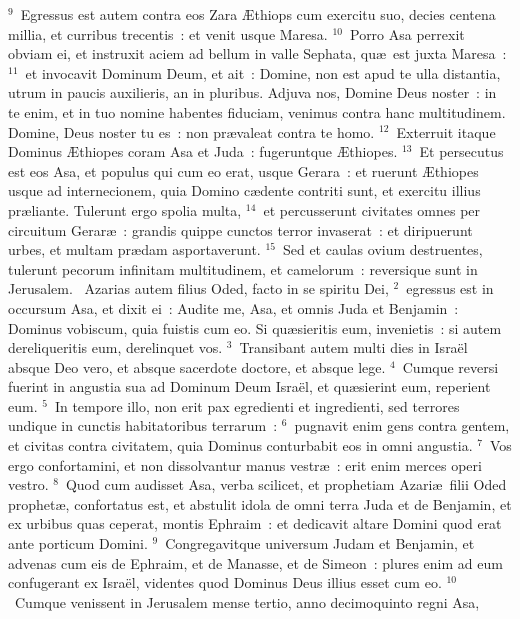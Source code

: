 ${}^{9}$~Egressus est autem contra eos Zara \AE thiops cum exercitu suo, decies centena millia, et curribus trecentis~: et venit usque Maresa.
${}^{10}$~Porro Asa perrexit obviam ei, et instruxit aciem ad bellum in valle Sephata, qu\ae\ est juxta Maresa~:
${}^{11}$~et invocavit Dominum Deum, et ait~: Domine, non est apud te ulla distantia, utrum in paucis auxilieris, an in pluribus. Adjuva nos, Domine Deus noster~: in te enim, et in tuo nomine habentes fiduciam, venimus contra hanc multitudinem. Domine, Deus noster tu es~: non pr\ae valeat contra te homo.
${}^{12}$~Exterruit itaque Dominus \AE thiopes coram Asa et Juda~: fugeruntque \AE thiopes.
${}^{13}$~Et persecutus est eos Asa, et populus qui cum eo erat, usque Gerara~: et ruerunt \AE thiopes usque ad internecionem, quia Domino c\ae dente contriti sunt, et exercitu illius pr\ae liante. Tulerunt ergo spolia multa,
${}^{14}$~et percusserunt civitates omnes per circuitum Gerar\ae~: grandis quippe cunctos terror invaserat~: et diripuerunt urbes, et multam pr\ae dam asportaverunt.
${}^{15}$~Sed et caulas ovium destruentes, tulerunt pecorum infinitam multitudinem, et camelorum~: reversique sunt in Jerusalem.
~Azarias autem filius Oded, facto in se spiritu Dei,
${}^{2}$~egressus est in occursum Asa, et dixit ei~: Audite me, Asa, et omnis Juda et Benjamin~: Dominus vobiscum, quia fuistis cum eo. Si qu\ae sieritis eum, invenietis~: si autem dereliqueritis eum, derelinquet vos.
${}^{3}$~Transibant autem multi dies in Isra\"el absque Deo vero, et absque sacerdote doctore, et absque lege.
${}^{4}$~Cumque reversi fuerint in angustia sua ad Dominum Deum Isra\"el, et qu\ae sierint eum, reperient eum.
${}^{5}$~In tempore illo, non erit pax egredienti et ingredienti, sed terrores undique in cunctis habitatoribus terrarum~:
${}^{6}$~pugnavit enim gens contra gentem, et civitas contra civitatem, quia Dominus conturbabit eos in omni angustia.
${}^{7}$~Vos ergo confortamini, et non dissolvantur manus vestr\ae~: erit enim merces operi vestro.
${}^{8}$~Quod cum audisset Asa, verba scilicet, et prophetiam Azari\ae\ filii Oded prophet\ae , confortatus est, et abstulit idola de omni terra Juda et de Benjamin, et ex urbibus quas ceperat, montis Ephraim~: et dedicavit altare Domini quod erat ante porticum Domini.
${}^{9}$~Congregavitque universum Judam et Benjamin, et advenas cum eis de Ephraim, et de Manasse, et de Simeon~: plures enim ad eum confugerant ex Isra\"el, videntes quod Dominus Deus illius esset cum eo.
${}^{10}$~Cumque venissent in Jerusalem mense tertio, anno decimoquinto regni Asa,
